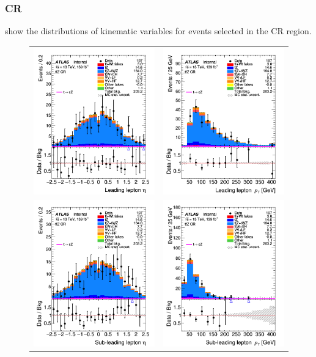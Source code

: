 \clearpage
\FloatBarrier
\subsubsection{\ttZ CR}
 show the distributions 
of kinematic variables for events selected in the \ttZ CR region.

\begin{figure}[!htbp]
	\centering
	\begin{tabular}{cc}
		\includegraphics[width=.32\textwidth]{Chapters/CH6/figures/TTZCR/lep1_eta} &
		\includegraphics[width=.32\textwidth]{Chapters/CH6/figures/TTZCR/lep1_pt} \\
		\includegraphics[width=.32\textwidth]{Chapters/CH6/figures/TTZCR/lep2_eta} &
		\includegraphics[width=.32\textwidth]{Chapters/CH6/figures/TTZCR/lep2_pt} \\

\end{tabular}
\end{figure}

